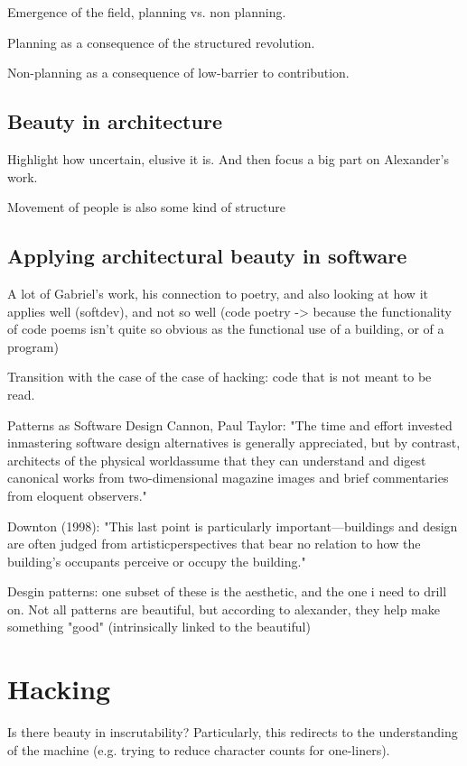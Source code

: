 \documentclass{article}
\begin{document}
Emergence of the field, planning vs. non planning.

Planning as a consequence of the structured revolution.

Non-planning as a consequence of low-barrier to contribution.

\subsection{Beauty in architecture}

Highlight how uncertain, elusive it is. And then focus a big part on Alexander's work.

Movement of people is also some kind of structure

\subsection{Applying architectural beauty in software}

A lot of Gabriel's work, his connection to poetry, and also looking at how it applies well (softdev), and not so well (code poetry -> because the functionality of code poems isn't quite so obvious as the functional use of a building, or of a program)

Transition with the case of the case of hacking: code that is not meant to be read.

Patterns as Software Design Cannon, Paul Taylor: "The  time  and  effort  invested  inmastering software design alternatives is generally appreciated, but by contrast, architects of the physical worldassume that they can understand and digest canonical works from two-dimensional magazine images and brief commentaries from eloquent observers."

Downton (1998): "This  last  point  is  particularly  important—buildings  and  design  are  often  judged  from  artisticperspectives that bear no relation to how the building’s occupants perceive or occupy the building."

Desgin patterns: one subset of these is the aesthetic, and the one i need to drill on. Not all patterns are beautiful, but according to alexander, they help make something "good" (intrinsically linked to the beautiful)

\section{Hacking}

Is there beauty in inscrutability? Particularly, this redirects to the understanding of the machine (e.g. trying to reduce character counts for one-liners).
\end{document}
